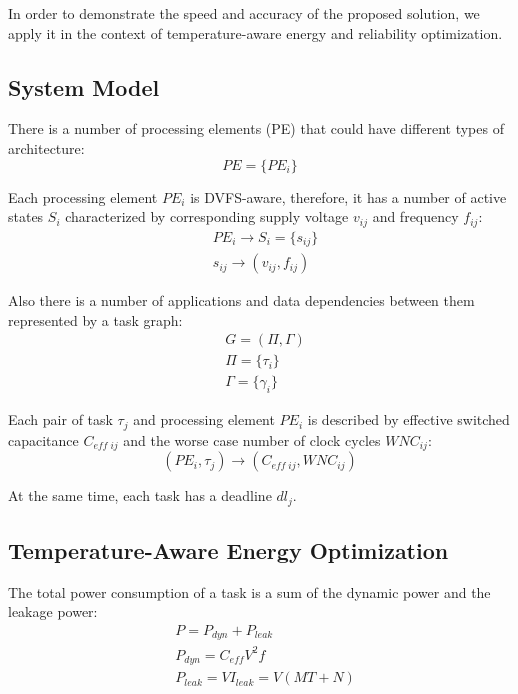 In order to demonstrate the speed and accuracy of the proposed solution, we apply it in the context of temperature-aware energy and reliability optimization.

\subsection{System Model}
There is a number of processing elements (PE) that could have different types of architecture:
\[
  PE = \{ PE_i \}
\]


Each processing element $PE_i$ is DVFS-aware, therefore, it has a number of active states $S_i$ characterized by corresponding supply voltage $v_{ij}$ and frequency $f_{ij}$:
\begin{align*}
  & PE_i \rightarrow S_i = \{ s_{ij} \} \\
  & s_{ij} \rightarrow (v_{ij}, f_{ij})
\end{align*}

Also there is a number of applications and data dependencies between them represented by a task graph:
\begin{align*}
  & G = (\Pi, \Gamma) \\
  & \Pi = \{\tau_i\} \\
  & \Gamma = \{\gamma_i\}
\end{align*}

Each pair of task $\tau_j$ and processing element $PE_i$ is described by effective switched capacitance $C_{eff \; ij}$ and the worse case number of clock cycles $WNC_{ij}$:
\[
  (PE_i, \tau_j) \rightarrow (C_{eff \; ij}, WNC_{ij})
\]

At the same time, each task has a deadline $dl_j$.

\subsection{Temperature-Aware Energy Optimization}
The total power consumption of a task is a sum of the dynamic power and the leakage power:
\begin{align*}
  & P = P_{dyn} + P_{leak} \\
  & P_{dyn} = C_{eff} V^2 f \\
  & P_{leak} = V I_{leak} = V (MT + N)
\end{align*}

